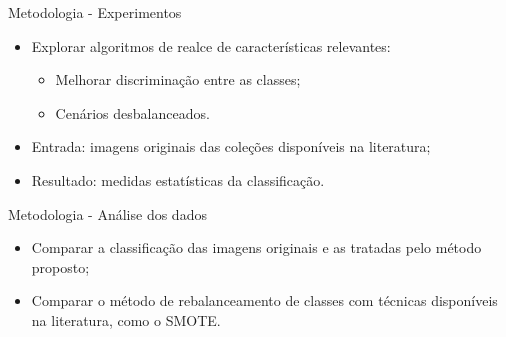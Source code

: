 \documentclass{beamer}
\begin{document}
\begin{frame}{Metodologia - Experimentos}
\setlength\leftmargini{1em}
\begin{block}{}
\justifying
\begin{itemize}
\item Explorar algoritmos de realce de características relevantes:
\begin{itemize}
\item Melhorar discriminação entre as classes;
\item Cenários desbalanceados.
\end{itemize}
\item Entrada: imagens originais das coleções disponíveis na literatura;
\item Resultado: medidas estatísticas da classificação.
\end{itemize}
\end{block}
\end{frame}
\begin{frame}{Metodologia - Análise dos dados}
\setlength\leftmargini{1em}
\begin{block}{}
\justifying
\begin{itemize}
\item Comparar a classificação das imagens originais e as tratadas pelo método proposto;
\item Comparar o método de rebalanceamento de classes com técnicas disponíveis na literatura, como o SMOTE.
\end{itemize}
\end{block}
\end{frame}
\end{document}
